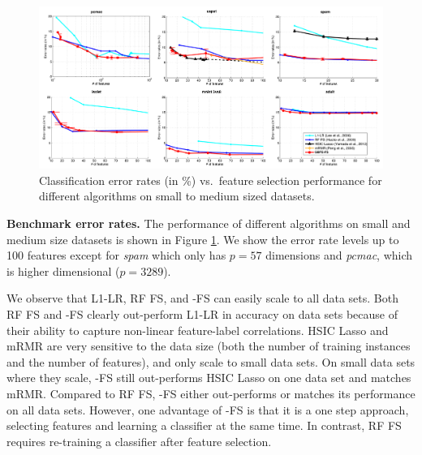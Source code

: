 \begin{figure}[t!!!]
\centerline{
\includegraphics[width = 1.05\textwidth]{plots/results_071_100}
}
\caption{Classification error rates (in \%) vs.\ feature selection performance for different algorithms on small to medium sized datasets.}
\label{fig:results}
\end{figure}

\textbf{Benchmark error rates.}
The performance of different algorithms on small and medium size datasets is shown in Figure \ref{fig:results}. We show the error rate levels up to 100 features except for \emph{spam} which only has $p=57$ dimensions and \emph{pcmac}, which is higher dimensional ($p=3289$). 

We observe that L1-LR, RF FS, and \name{}-FS can easily scale to all data sets. Both RF FS and \name{}-FS clearly out-perform L1-LR in accuracy on data sets because of their ability to capture non-linear feature-label correlations. HSIC Lasso and mRMR are very sensitive to the data size (both the number of training instances and the number of features), and only scale to small data sets. On small data sets where they scale, \name{}-FS still out-performs HSIC Lasso on one data set and matches mRMR. Compared to RF FS, \name{}-FS either out-performs or matches its performance on all data sets. However, one advantage of \name{}-FS is that it is a one step approach, selecting features and learning a classifier at the same time. In contrast, RF FS requires re-training a classifier after feature selection.

